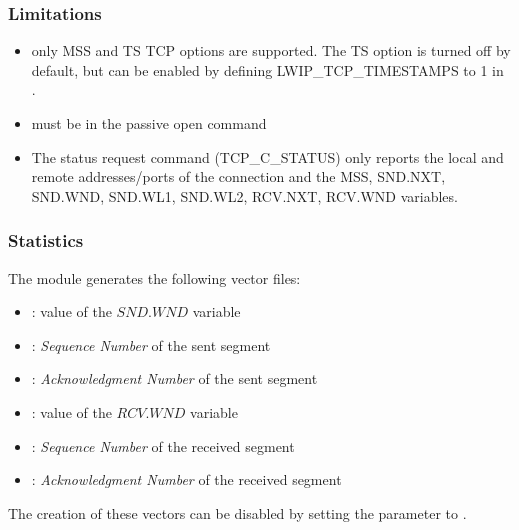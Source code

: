 \subsubsection*{Limitations}

\begin{itemize}
  \item only MSS and TS TCP options are supported. The TS option is turned off
        by default, but can be enabled by defining LWIP\_TCP\_TIMESTAMPS to 1
        in .
  \item {} must be  in the passive open command
  \item The status request command (TCP\_C\_STATUS) only reports the
          local and remote addresses/ports of the connection and
          the MSS, SND.NXT, SND.WND, SND.WL1, SND.WL2, RCV.NXT, RCV.WND variables.
\end{itemize}


\subsubsection*{Statistics}

The  module generates the following vector files:

\begin{itemize}
  \item {}: value of the $SND.WND$ variable
  \item {}: \emph{Sequence Number} of the sent segment
  \item {}: \emph{Acknowledgment Number } of the sent segment
  \item {}: value of the $RCV.WND$ variable
  \item {}: \emph{Sequence Number} of the received segment
  \item {}: \emph{Acknowledgment Number} of the received segment
\end{itemize}

The creation of these vectors can be disabled by setting the 
parameter to .


